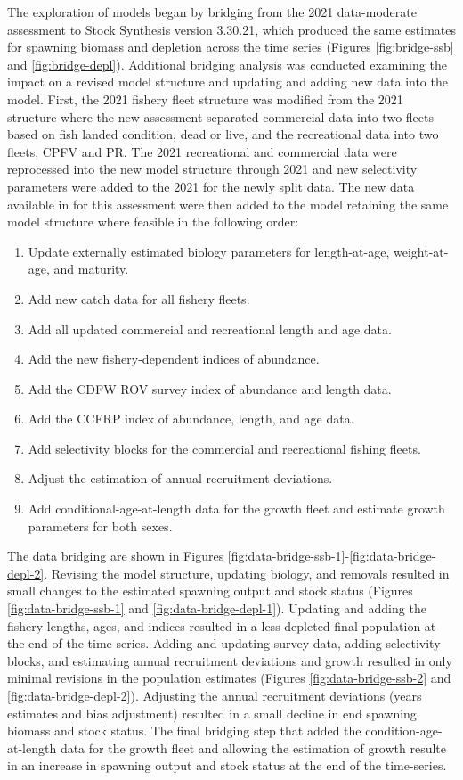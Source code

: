 \documentclass[11pt,
  english,
  letterpaper,
]{article}
\providecommand{\tightlist}{%
  \setlength{\itemsep}{0pt}\setlength{\parskip}{0pt}}
\providecommand{\tightlist}{%
  \setlength{\itemsep}{0pt}\setlength{\parskip}{0pt}}
\begin{document}
The exploration of models began by bridging from the 2021 data-moderate assessment to Stock Synthesis version 3.30.21, which produced the same estimates for spawning biomass and depletion across the time series (Figures \ref{fig:bridge-ssb} and \ref{fig:bridge-depl}). Additional bridging analysis was conducted examining the impact on a revised model structure and updating and adding new data into the model. First, the 2021 fishery fleet structure was modified from the 2021 structure where the new assessment separated commercial data into two fleets based on fish landed condition, dead or live, and the recreational data into two fleets, CPFV and PR. The 2021 recreational and commercial data were reprocessed into the new model structure through 2021 and new selectivity parameters were added to the 2021 for the newly split data. The new data available in for this assessment were then added to the model retaining the same model structure where feasible in the following order:

\begin{enumerate}
\def\labelenumi{\arabic{enumi}.}
\tightlist
\item
  Update externally estimated biology parameters for length-at-age, weight-at-age, and maturity.
\item
  Add new catch data for all fishery fleets.
\item
  Add all updated commercial and recreational length and age data.
\item
  Add the new fishery-dependent indices of abundance.
\item
  Add the CDFW ROV survey index of abundance and length data.
\item
  Add the CCFRP index of abundance, length, and age data.
\item
  Add selectivity blocks for the commercial and recreational fishing fleets.
\item
  Adjust the estimation of annual recruitment deviations.
\item
  Add conditional-age-at-length data for the growth fleet and estimate growth parameters for both sexes.
\end{enumerate}

The data bridging are shown in Figures \ref{fig:data-bridge-ssb-1}-\ref{fig:data-bridge-depl-2}. Revising the model structure, updating biology, and removals resulted in small changes to the estimated spawning output and stock status (Figures \ref{fig:data-bridge-ssb-1} and \ref{fig:data-bridge-depl-1}). Updating and adding the fishery lengths, ages, and indices resulted in a less depleted final population at the end of the time-series. Adding and updating survey data, adding selectivity blocks, and estimating annual recruitment deviations and growth resulted in only minimal revisions in the population estimates (Figures \ref{fig:data-bridge-ssb-2} and \ref{fig:data-bridge-depl-2}). Adjusting the annual recruitment deviations (years estimates and bias adjustment) resulted in a small decline in end spawning biomass and stock status. The final bridging step that added the condition-age-at-length data for the growth fleet and allowing the estimation of growth resulte in an increase in spawning output and stock status at the end of the time-series.
\end{document}
